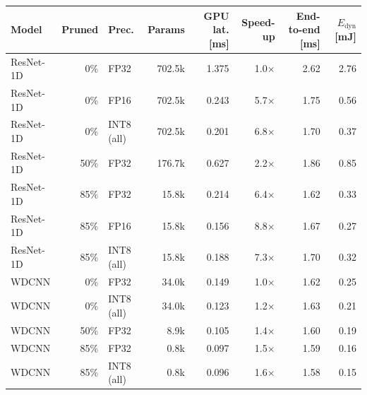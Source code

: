 \begin{tabular}{l r l r r r r r}
\toprule
Model & Pruned & Prec. & Params & GPU lat. [ms] & Speed-up & End-to-end [ms] & $E_{\mathrm{dyn}}$ [mJ] \\
\midrule
ResNet-1D & 0\% & FP32 & 702.5k & 1.375 & 1.0$\times$ & 2.62 & 2.76 \\
ResNet-1D & 0\% & FP16 & 702.5k & 0.243 & 5.7$\times$ & 1.75 & 0.56 \\
ResNet-1D & 0\% & INT8 (all) & 702.5k & 0.201 & 6.8$\times$ & 1.70 & 0.37 \\
ResNet-1D & 50\% & FP32 & 176.7k & 0.627 & 2.2$\times$ & 1.86 & 0.85 \\
ResNet-1D & 85\% & FP32 & 15.8k & 0.214 & 6.4$\times$ & 1.62 & 0.33 \\
ResNet-1D & 85\% & FP16 & 15.8k & 0.156 & 8.8$\times$ & 1.67 & 0.27 \\
ResNet-1D & 85\% & INT8 (all) & 15.8k & 0.188 & 7.3$\times$ & 1.70 & 0.32 \\
\midrule
WDCNN & 0\% & FP32 & 34.0k & 0.149 & 1.0$\times$ & 1.62 & 0.25 \\
WDCNN & 0\% & INT8 (all) & 34.0k & 0.123 & 1.2$\times$ & 1.63 & 0.21 \\
WDCNN & 50\% & FP32 & 8.9k & 0.105 & 1.4$\times$ & 1.60 & 0.19 \\
WDCNN & 85\% & FP32 & 0.8k & 0.097 & 1.5$\times$ & 1.59 & 0.16 \\
WDCNN & 85\% & INT8 (all) & 0.8k & 0.096 & 1.6$\times$ & 1.58 & 0.15 \\
\bottomrule
\end{tabular}
